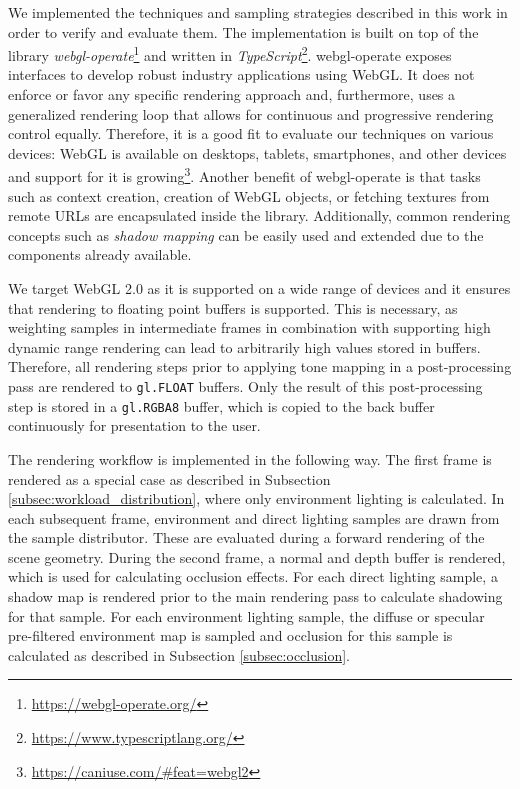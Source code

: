 \documentclass[sigconf,authorversion]{acmart}
\begin{document}
We implemented the techniques and sampling strategies described in this work in order to verify and evaluate them.
The implementation is built on top of the library \textit{webgl-operate}\footnote{\url{https://webgl-operate.org/}} and written in \textit{TypeScript}\footnote{\url{https://www.typescriptlang.org/}}.
webgl-operate exposes interfaces to develop robust industry applications using WebGL. 
It does not enforce or favor any specific rendering approach and, furthermore, uses a generalized rendering loop that allows for continuous and progressive rendering control equally.
Therefore, it is a good fit to evaluate our techniques on various devices:
WebGL is available on desktops, tablets, smartphones, and other devices and support for it is growing\footnote{\url{https://caniuse.com/\#feat=webgl2}}.
Another benefit of webgl-operate is that tasks such as context creation, creation of WebGL objects, or fetching textures from remote URLs are encapsulated inside the library.
Additionally, common rendering concepts such as \emph{shadow mapping} can be easily used and extended due to the components already available.

We target WebGL 2.0 as it is supported on a wide range of devices and it ensures that rendering to floating point buffers is supported.
This is necessary, as weighting samples in intermediate frames in combination with supporting high dynamic range rendering can lead to arbitrarily high values stored in buffers.
Therefore, all rendering steps prior to applying tone mapping \cite{salih2012tone} in a post-processing pass are rendered to \texttt{gl.FLOAT} buffers.
Only the result of this post-processing step is stored in a \texttt{gl.RGBA8} buffer, which is copied to the back buffer continuously for presentation to the user.

The rendering workflow is implemented in the following way.
The first frame is rendered as a special case as described in Subsection \ref{subsec:workload_distribution}, where only environment lighting is calculated.
In each subsequent frame, environment and direct lighting samples are drawn from the sample distributor.
These are evaluated during a forward rendering of the scene geometry.
During the second frame, a normal and depth buffer is rendered, which is used for calculating occlusion effects.
For each direct lighting sample, a shadow map is rendered prior to the main rendering pass to calculate shadowing for that sample.
For each environment lighting sample, the diffuse or specular pre-filtered environment map is sampled and occlusion for this sample is calculated as described in Subsection \ref{subsec:occlusion}.
\end{document}
